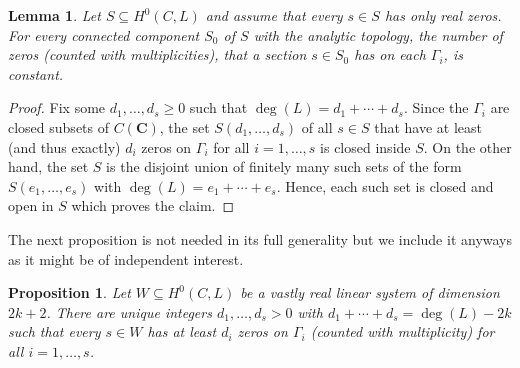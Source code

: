 \documentclass[12pt]{amsart}
\newcounter{thmcounter}
\numberwithin{equation}{section}
\numberwithin{thmcounter}{section}
\newtheorem{proposition}[thmcounter]{Proposition}
\newtheorem{lemma}[thmcounter]{Lemma}
\theoremstyle{definition}
\theoremstyle{claim}
\newcommand{\nC}{\mathbf{C}}
\begin{document}
\begin{lemma}\label{lem:numbersconstant}
 Let $S\subseteq H^0(C,L)$ and assume that every $s\in S$ has only real zeros. For every connected component $S_0$ of $S$ with the analytic topology, the number of zeros (counted with multiplicities), that a section $s\in S_0$ has on each $\Gamma_i$, is constant.
\end{lemma}

\begin{proof}
 Fix some $d_1,\ldots,d_s\geq0$ such that $\deg(L)=d_1+\cdots+d_s$.
 Since the $\Gamma_i$ are closed subsets of $C(\nC)$, the set $S(d_1,\ldots,d_s)$ of all $s\in S$ that have at least (and thus exactly) $d_i$ zeros on $\Gamma_i$ for all $i=1,\ldots,s$ is closed inside $S$. On the other hand, the set $S$ is the disjoint union of finitely many such sets of the form $S(e_1,\ldots,e_s)$ with $\deg(L)=e_1+\cdots+e_s$. Hence, each such set is closed and open in $S$ which proves the claim.
\end{proof}

The next proposition is not needed in its full generality but we include it anyways as it might be of independent interest.

\begin{proposition}\label{prop:typex}
 Let $W\subseteq H^0(C,L)$ be a vastly real linear system of dimension $2k+2$. There are unique integers $d_1,\ldots,d_s>0$ with $d_1+\cdots+d_s=\deg(L)-2k$ such that every $s\in W$ has at least $d_i$ zeros on $\Gamma_i$ (counted with multiplicity) for all $i=1,\ldots,s$.
\end{proposition}
\end{document}
